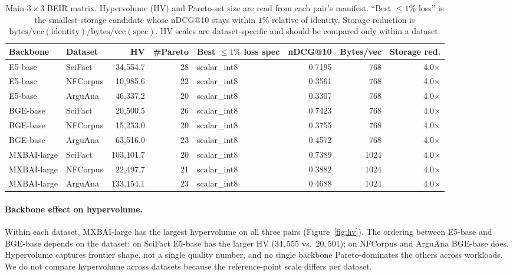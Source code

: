 \documentclass[sigconf]{acmart}
\makeatletter
\newcommand{\ndcg}{nDCG@10}
\newcommand{\bpv}{\mathrm{bytes/vec}}
\makeatother
\begin{document}
\begin{table}[t]
\centering
\small
\caption{Main 3\,$\times$\,3 BEIR matrix. Hypervolume (HV) and Pareto-set size are read from each pair's manifest. ``Best $\le\!1\%$ loss'' is the smallest-storage candidate whose \ndcg{} stays within $1\%$ relative of identity. Storage reduction is $\bpv(\mathrm{identity})/\bpv(\mathrm{spec})$. HV scales are dataset-specific and should be compared only within a dataset.}
\label{tab:main-pareto}
\begin{tabular}{llrrlrrr}
\toprule
Backbone & Dataset & HV & \#Pareto & Best $\le\!1\%$ loss spec & \ndcg & Bytes/vec & Storage red. \\
\midrule
E5-base      & SciFact  &  34{,}554.7 & 28 & scalar\_int8 & 0.7195 &  768 & 4.0$\times$ \\
E5-base      & NFCorpus &  10{,}985.6 & 22 & scalar\_int8 & 0.3561 &  768 & 4.0$\times$ \\
E5-base      & ArguAna  &  46{,}337.2 & 20 & scalar\_int8 & 0.3307 &  768 & 4.0$\times$ \\
BGE-base     & SciFact  &  20{,}500.5 & 26 & scalar\_int8 & 0.7423 &  768 & 4.0$\times$ \\
BGE-base     & NFCorpus &  15{,}253.0 & 20 & scalar\_int8 & 0.3755 &  768 & 4.0$\times$ \\
BGE-base     & ArguAna  &  63{,}516.0 & 23 & scalar\_int8 & 0.4572 &  768 & 4.0$\times$ \\
MXBAI-large  & SciFact  & 103{,}101.7 & 20 & scalar\_int8 & 0.7389 & 1024 & 4.0$\times$ \\
MXBAI-large  & NFCorpus &  22{,}497.7 & 21 & scalar\_int8 & 0.3882 & 1024 & 4.0$\times$ \\
MXBAI-large  & ArguAna  & 133{,}154.1 & 23 & scalar\_int8 & 0.4688 & 1024 & 4.0$\times$ \\
\bottomrule
\end{tabular}
\end{table}

\paragraph{Backbone effect on hypervolume.} Within each dataset, MXBAI-large has the largest hypervolume on all three pairs (Figure~\ref{fig:hv}). The ordering between E5-base and BGE-base depends on the dataset: on SciFact E5-base has the larger HV ($34{,}555$ vs.\ $20{,}501$); on NFCorpus and ArguAna BGE-base does. Hypervolume captures frontier shape, not a single quality number, and no single backbone Pareto-dominates the others across workloads. We do not compare hypervolume across datasets because the reference-point scale differs per dataset.
\end{document}
